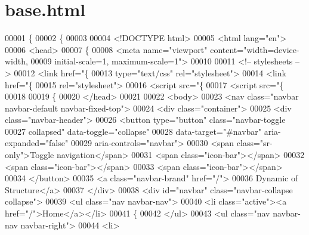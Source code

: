 \hypertarget{base_8html_source}{}\section{base.\+html}
\label{base_8html_source}

\begin{DoxyCode}
00001 \{%
00002 \{%
00003 
00004 <!DOCTYPE html>
00005 <html lang="en">
00006     <head>
00007         \{%
00008         <meta name="viewport" content="width=device-width,
00009             initial-scale=1, maximum-scale=1">
00010         
00011             <!-- stylesheets -->
00012         <link href="\{%
00013             type="text/css" rel="stylesheet">
00014         <link href="\{%
00015             rel="stylesheet">
00016         <script src="\{%
00017         <script src="\{%
00018        
00019         \{%
00020     </head>
00021 
00022        <body>
00023         <nav class="navbar navbar-default navbar-fixed-top">
00024             <div class="container">
00025                 <div class="navbar-header">
00026                     <button type="button" class="navbar-toggle 
00027                         collapsed" data-toggle="collapse" 
00028                         data-target="#navbar" aria-expanded="false" 
00029                         aria-controls="navbar">
00030                          <span class="sr-only">Toggle navigation</span>
00031                          <span class="icon-bar"></span>
00032                          <span class="icon-bar"></span>
00033                          <span class="icon-bar"></span>
00034                     </button>
00035                     <a class="navbar-brand" href="/">
00036                         Dynamic of Structure</a>
00037                 </div>
00038                 <div id="navbar" class="navbar-collapse collapse">
00039                     <ul class="nav navbar-nav">
00040                         <li class="active"><a href="/">Home</a></li>
00041                         \{%
00042                     </ul>
00043                     <ul class="nav navbar-nav navbar-right">
00044                         <li>

\end{DoxyCode}
